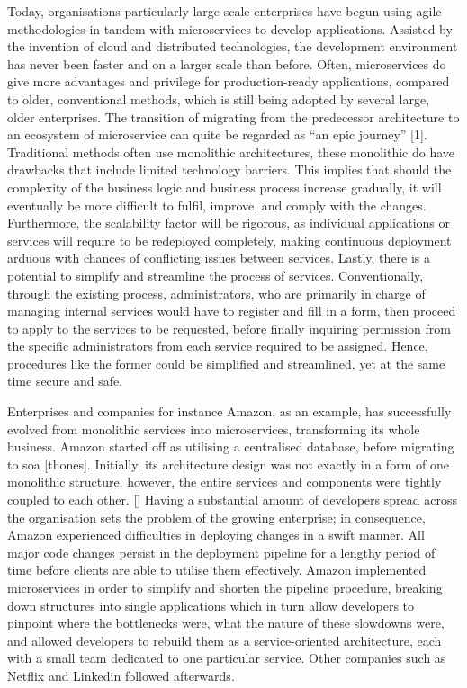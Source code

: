 \documentclass[conference, a4paper]{IEEEtran}
\begin{document}
Today, organisations particularly large-scale enterprises have begun using agile methodologies in tandem with microservices to develop applications. 
Assisted by the invention of cloud and distributed technologies, the development environment has never been faster and on a larger scale than before. 
Often, microservices do give more advantages and privilege for production-ready applications, compared to older, conventional methods, which is still being adopted by several large, older enterprises. 
The transition of migrating from the predecessor architecture to an ecosystem of microservice can quite be regarded as “an epic journey” [1]. 
Traditional methods often use monolithic architectures, these monolithic do have drawbacks that include limited technology barriers. 
This implies that should the complexity of the business logic and business process increase gradually, it will eventually be more difficult to fulfil, improve, and comply with the changes. 
Furthermore, the scalability factor will be rigorous, as individual applications or services will require to be redeployed completely, making continuous deployment arduous with chances of conflicting issues between services. 
Lastly, there is a potential to simplify and streamline the process of services. 
Conventionally, through the existing process, administrators, who are primarily in charge of managing internal services would have to register and fill in a form, then proceed to apply to the services to be requested, before finally inquiring permission from the specific administrators from each service 
required to be assigned. 
Hence, procedures like the former could be simplified and streamlined, yet at the same time secure and safe. 

Enterprises and companies for instance Amazon, as an example, has successfully evolved from monolithic services into microservices, transforming its whole business. 
Amazon started off as utilising a centralised database, before migrating to \gls{soa} [thones]. 
Initially, its architecture design was not exactly in a form of one monolithic structure, however, the entire services and components were tightly coupled to each other. []
Having a substantial amount of developers spread across the organisation sets the problem of the growing enterprise; 
in consequence, Amazon experienced difficulties in deploying changes in a swift manner. All major code changes persist in the deployment pipeline for a lengthy period of time before clients are able to utilise them effectively. 
Amazon implemented microservices in order to simplify and shorten the pipeline procedure, breaking down structures into single applications which in turn allow developers to pinpoint where the bottlenecks were, what the nature of these slowdowns were, and allowed developers to rebuild them as a service-oriented architecture, each with a small team dedicated to one particular service. 
Other companies such as Netflix and Linkedin followed afterwards. 
\end{document}
